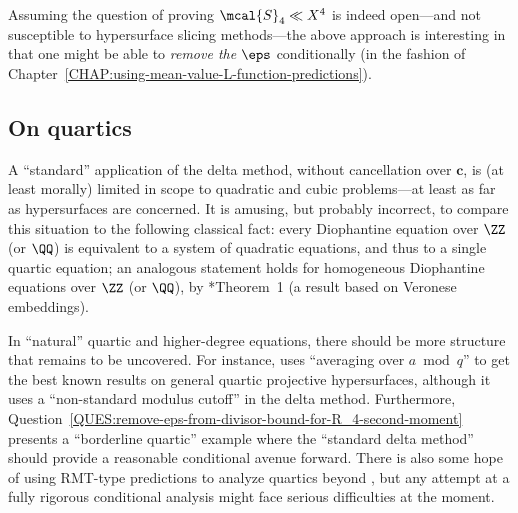 \documentclass[12pt]{report}
\begin{document}

Assuming the question of proving $\mcal{S}_4\ll X^4$ is indeed
open---and not susceptible to hypersurface slicing methods---the
above approach is interesting in that one might be able to
\emph{remove the $\eps$} conditionally (in the fashion of Chapter~\ref{CHAP:using-mean-value-L-function-predictions}).

\subsection{On quartics}

A ``standard'' application of the delta method, without cancellation over $\bm{c}$, is (at least morally) limited in scope to quadratic and cubic problems---at least as far as hypersurfaces are concerned.
It is amusing, but probably incorrect, to compare this situation to the following classical fact:
every Diophantine equation over $\ZZ$ (or $\QQ$) is equivalent to a system of quadratic equations, and thus to a single quartic equation;
an analogous statement holds for homogeneous Diophantine equations over $\ZZ$ (or $\QQ$), by \cite{mumford1970varieties}*{Theorem~1} (a result based on Veronese embeddings).

In ``natural'' quartic and higher-degree equations, there should be more structure that remains to be uncovered.
For instance,
\cite{marmon2019hasse} uses ``averaging over $a\bmod{q}$'' to get the best known results on general quartic projective hypersurfaces,
although it uses a ``non-standard modulus cutoff'' in the delta method.
Furthermore,
Question~\ref{QUES:remove-eps-from-divisor-bound-for-R_4-second-moment} presents
a ``borderline quartic'' example where
the ``standard delta method'' should provide a reasonable conditional avenue forward.
There is also some hope of using RMT-type predictions to analyze quartics beyond \cite{marmon2019hasse},
but any attempt at a fully rigorous conditional analysis might face serious difficulties at the moment.
\end{document}
